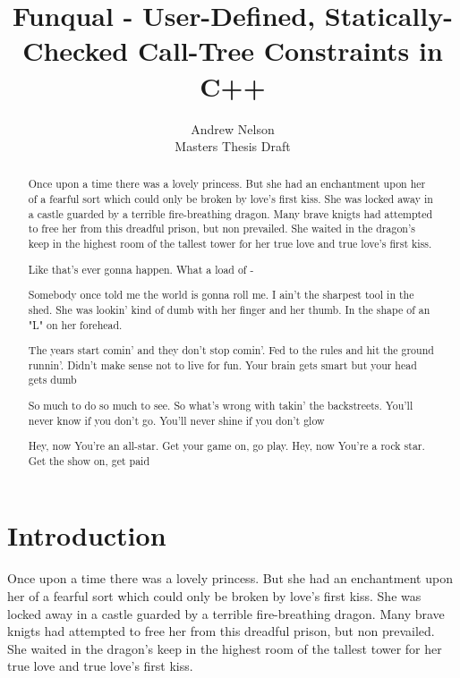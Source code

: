 \documentclass{article}
\begin{document}
\begin{titlepage}
\title{Funqual - User-Defined, Statically-Checked Call-Tree Constraints in C++}
\author{Andrew Nelson\\Masters Thesis Draft}

\maketitle

\begin{abstract}
    Once upon a time there was a lovely princess.  But she had an enchantment upon her of a fearful sort which could only be broken by love's first kiss.  She was locked away in a castle guarded by a terrible fire-breathing dragon.  Many brave knigts had attempted to free her from this dreadful prison, but non prevailed.  She waited in the dragon's keep in the highest room of the tallest tower for her true love and true love's first kiss.

    Like that's ever gonna happen.  What a load of - 

    Somebody once told me the world is gonna roll me. I ain't the sharpest tool in the shed. She was lookin' kind of dumb with her finger and her thumb.  In the shape of an "L" on her forehead.

    The years start comin' and they don't stop comin'. Fed to the rules and hit the ground runnin'.  Didn't make sense not to live for fun.  Your brain gets smart but your head gets dumb

    So much to do so much to see. So what's wrong with takin' the backstreets.  You'll never know if you don't go.  You'll never shine if you don't glow 

    Hey, now You're an all-star.  Get your game on, go play.  Hey, now You're a rock star.  Get the show on, get paid


\end{abstract}
\end{titlepage}

\newpage

\tableofcontents

\newpage
{}
\twocolumn


\section{Introduction}

Once upon a time there was a lovely princess.  But she had an enchantment upon her of a fearful sort which could only be broken by love's first kiss.  She was locked away in a castle guarded by a terrible fire-breathing dragon.  Many brave knigts had attempted to free her from this dreadful prison, but non prevailed.  She waited in the dragon's keep in the highest room of the tallest tower for her true love and true love's first kiss.
\end{document}
